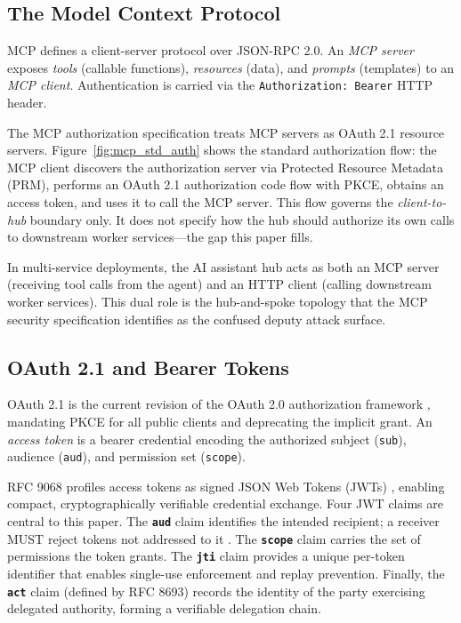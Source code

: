 \documentclass[journal]{IEEEtran}
\theoremstyle{definition}
\begin{document}
\subsection{The Model Context Protocol}

MCP \cite{mcp_spec} defines a client-server protocol over JSON-RPC 2.0. An
\textit{MCP server} exposes \textit{tools} (callable functions), \textit{resources}
(data), and \textit{prompts} (templates) to an \textit{MCP client}. Authentication
is carried via the \texttt{Authorization: Bearer} HTTP header.

The MCP authorization specification \cite{mcp_spec_2025} treats MCP servers as
OAuth 2.1 resource servers. Figure~\ref{fig:mcp_std_auth} shows the standard
authorization flow: the MCP client discovers the authorization server via
Protected Resource Metadata (PRM), performs an OAuth 2.1 authorization code flow
with PKCE, obtains an access token, and uses it to call the MCP server. This flow
governs the \textit{client-to-hub} boundary only. It does not specify how the hub
should authorize its own calls to downstream worker services---the gap this paper
fills.

In multi-service deployments, the AI assistant hub acts as both an MCP server
(receiving tool calls from the agent) and an HTTP client (calling downstream
worker services). This dual role is the hub-and-spoke topology that the MCP
security specification identifies as the confused deputy attack surface.

\subsection{OAuth 2.1 and Bearer Tokens}

OAuth 2.1 \cite{oauth21} is the current revision of the OAuth 2.0 authorization
framework \cite{rfc6749}, mandating PKCE for all public clients and deprecating
the implicit grant. An \textit{access token} is a bearer credential encoding the
authorized subject (\texttt{sub}), audience (\texttt{aud}), and permission set
(\texttt{scope}).

RFC 9068 \cite{rfc9068} profiles access tokens as signed JSON Web Tokens
(JWTs) \cite{rfc7519}, enabling compact, cryptographically verifiable
credential exchange. Four JWT claims are central to this paper.
The \textbf{\texttt{aud}} claim identifies the intended recipient; a receiver
MUST reject tokens not addressed to it \cite{rfc9068}.
The \textbf{\texttt{scope}} claim carries the set of permissions the token grants.
The \textbf{\texttt{jti}} claim provides a unique per-token identifier that
enables single-use enforcement and replay prevention.
Finally, the \textbf{\texttt{act}} claim (defined by RFC 8693) records the
identity of the party exercising delegated authority, forming a verifiable
delegation chain.
\end{document}
